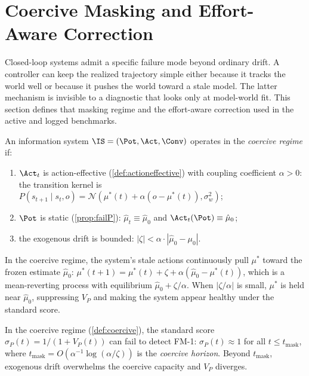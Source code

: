 \section{Coercive Masking and Effort-Aware Correction}\label{sec:ruffini}

Closed-loop systems admit a specific failure mode beyond ordinary drift. A
controller can keep the realized trajectory simple either because it tracks the
world well or because it pushes the world toward a stale model. The latter
mechanism is invisible to a diagnostic that looks only at model-world fit. This
section defines that masking regime and the effort-aware correction used in the
active and logged benchmarks.

\begin{definition}\label{def:coercive}
An information system $\IS = (\Pot, \Act, \Conv)$ operates in the
\emph{coercive regime} if:
\begin{enumerate}[label=\textnormal{(\roman*)}]
  \item $\Act_t$ is action-effective (\cref{def:actioneffective}) with
    coupling coefficient $\alpha > 0$: the transition kernel is
    $P(s_{t+1} \mid s_t, o) = \mathcal{N}(\mu^*(t) + \alpha(o - \mu^*(t)),
    \sigma_w^2)$;
  \item $\Pot$ is static (\cref{prop:failP}): $\hat\mu_t \equiv \hat\mu_0$
    and $\Act_t(\Pot) \equiv \hat\mu_0$;
  \item the exogenous drift is bounded:
    $|\zeta| < \alpha \cdot |\hat\mu_0 - \mu_0|$.
\end{enumerate}
\end{definition}

In the coercive regime, the system's stale actions continuously pull
$\mu^*$ toward the frozen estimate $\hat\mu_0$:
$\mu^*(t+1) = \mu^*(t) + \zeta + \alpha(\hat\mu_0 - \mu^*(t))$,
which is a mean-reverting process with equilibrium $\hat\mu_0 + \zeta/\alpha$.
When $|\zeta/\alpha|$ is small, $\mu^*$ is held near $\hat\mu_0$,
suppressing $V_P$ and making the system appear healthy under the standard score.

\begin{corollary}\label{cor:coercive}
In the coercive regime (\cref{def:coercive}), the standard score
$\sigma_P(t) = 1/(1 + V_P(t))$ can fail to detect FM-1:
$\sigma_P(t) \approx 1$ for all $t \leq t_{\mathrm{mask}}$, where
$t_{\mathrm{mask}} = O(\alpha^{-1} \log(\alpha/\zeta))$ is the
\emph{coercive horizon}. Beyond $t_{\mathrm{mask}}$, exogenous drift overwhelms
the coercive capacity and $V_P$ diverges.
\end{corollary}

